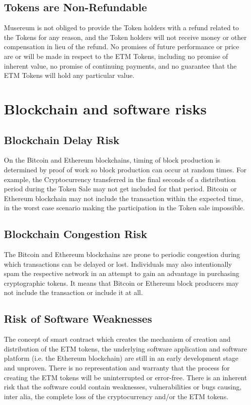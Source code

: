 \documentclass[12pt]{report}
\newcommand{\hlc}[1]{\colorbox{white!25}{#1}}
\begin{document}
\subsection*{Tokens are Non-Refundable}
\label{risks-value-non-refundable}
Musereum is not obliged to provide the Token holders with a refund related to the Tokens for any reason, and the Token holders will not receive money or other compensation in lieu of the refund. No promises of future performance or price are or will be made in respect to the ETM Tokens, including no promise of inherent value, no promise of continuing payments, and no guarantee that the ETM Tokens will hold any particular value. 

\section{Blockchain and software risks}
\label{risks-block}

\subsection*{Blockchain Delay Risk}
\label{risks-block-delay}
On the Bitcoin and Ethereum blockchains, timing of block production is determined by proof of work so block production can occur at random times. For example, the Cryptocurrency transferred in the final seconds of a distribution period during the Token Sale may not get included for that period. Bitcoin or Ethereum blockchain may not include the transaction within the expected time, in the worst case scenario making the participation in the Token sale impossible.

\subsection*{Blockchain Congestion Risk}
\label{risks-block-congestion}
The Bitcoin and Ethereum blockchains are prone to periodic congestion during which transactions can be delayed or lost. Individuals may also intentionally spam the respective network in an attempt to gain an advantage in purchasing cryptographic tokens. It means that Bitcoin or Ethereum block producers may not include the transaction or include it at all.

\subsection*{\hlc{Risk of Software Weaknesses}}
\label{risks-block-weaknesses}
The concept of smart contract which creates the mechanism of creation and distribution of the ETM tokens, the underlying software application and software platform (i.e. the Ethereum blockchain) are still in an early development stage and unproven. There is no representation and warranty that the process for creating the ETM tokens will be uninterrupted or error-free. There is an inherent risk that the software could contain weaknesses, vulnerabilities or bugs causing, inter alia, the complete loss of the cryptocurrency and/or the ETM tokens.
\end{document}

